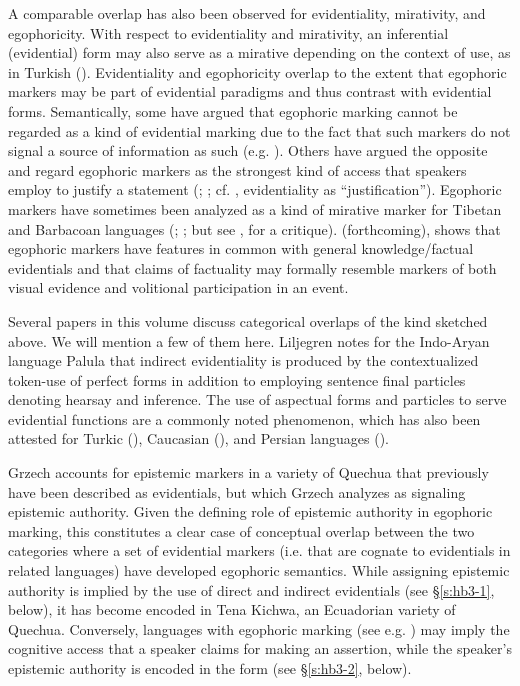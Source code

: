 \documentclass[output=paper]{langsci/langscibook}
\begin{document}
A comparable overlap has also been observed for evidentiality, mirativity, and egophoricity. With respect to evidentiality and mirativity, an inferential (evidential) form may also serve as a mirative depending on the context of use, as in Turkish (\citealt{SlobinAksu1982}). Evidentiality and egophoricity overlap to the extent that egophoric markers may be part of evidential paradigms and thus contrast with evidential forms. Semantically, some have argued that egophoric marking cannot be regarded as a kind of evidential marking due to the fact that such markers do not signal a source of information as such (e.g. \citealt{Aikhenvald2004}). Others have argued the opposite and regard egophoric markers as the strongest kind of access that speakers employ to justify a statement (\citealt{Plungian2010}; \citealt{SanRoqueLoughnane2012}; cf. \citealt{Boye2012}, evidentiality as ``justification''). Egophoric markers have sometimes been analyzed as a kind of mirative marker for Tibetan and Barbacoan languages (\citealt{DeLancey1997}; \citealt{Dickinson2000}; but see \citealt{Curnow2002b}, for a critique). \citeauthor{Kittila} (forthcoming), shows that egophoric markers have features in common with general knowledge/factual evidentials and that claims of factuality may formally resemble markers of both visual evidence and volitional participation in an event.

Several papers in this volume discuss categorical overlaps of the kind sketched above. We will mention a few of them here. Liljegren notes for the Indo-Aryan language Palula that indirect evidentiality is produced by the contextualized token-use of perfect forms in addition to employing sentence final particles denoting hearsay and inference. The use of aspectual forms and particles to serve evidential functions are a commonly noted phenomenon, which has also been attested for Turkic (\citealt{SlobinAksu1982}), Caucasian (\citealt{Tatevosov2001}), and Persian languages (\citealt{Lazard1996}).

Grzech accounts for epistemic markers in a variety of Quechua that previously have been described as evidentials, but which Grzech analyzes as signaling epistemic authority. Given the defining role of epistemic authority in egophoric marking, this constitutes a clear case of conceptual overlap between the two categories where a set of evidential markers (i.e. that are cognate to evidentials in related languages) have developed egophoric semantics. While assigning epistemic authority is implied by the use of direct and indirect evidentials (see §\ref{s:hb3-1}, below), it has become encoded in Tena Kichwa, an Ecuadorian variety of Quechua. Conversely, languages with egophoric marking (see e.g. \citealt{Tournadre2008}) may imply the cognitive access that a speaker claims for making an assertion, while the speaker’s epistemic authority is encoded in the form (see §\ref{s:hb3-2}, below).
\end{document}
